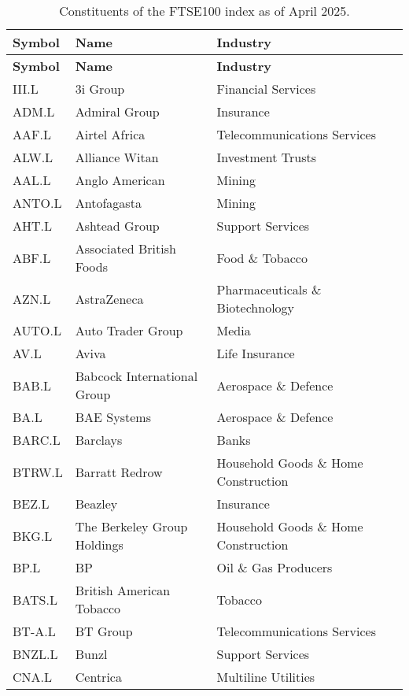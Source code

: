 \begin{longtable}{|p{2cm}|p{4cm}|p{6cm}|}
\caption{Constituents of the FTSE100 index as of April 2025. \cite{WikipediaFtse100}}
\label{tab:ftse100constituents}
\\ 
\hline
\textbf{Symbol} & \textbf{Name} & \textbf{Industry} \\ \midrule
\endfirsthead

\hline
\textbf{Symbol} & \textbf{Name} & \textbf{Industry} \\ \midrule
\endhead

\endfoot

\hline
III.L & 3i Group & Financial Services \\ \hline
ADM.L & Admiral Group & Insurance \\ \hline
AAF.L & Airtel Africa & Telecommunications Services \\ \hline
ALW.L & Alliance Witan & Investment Trusts \\ \hline
AAL.L & Anglo American & Mining \\ \hline
ANTO.L & Antofagasta & Mining \\ \hline
AHT.L & Ashtead Group & Support Services \\ \hline
ABF.L & Associated British Foods & Food \& Tobacco \\ \hline
AZN.L & AstraZeneca & Pharmaceuticals \& Biotechnology \\ \hline
AUTO.L & Auto Trader Group & Media \\ \hline
AV.L & Aviva & Life Insurance \\ \hline
BAB.L & Babcock International Group & Aerospace \& Defence \\ \hline
BA.L & BAE Systems & Aerospace \& Defence \\ \hline
BARC.L & Barclays & Banks \\ \hline
BTRW.L & Barratt Redrow & Household Goods \& Home Construction \\ \hline
BEZ.L & Beazley & Insurance \\ \hline
BKG.L & The Berkeley Group Holdings & Household Goods \& Home Construction \\ \hline
BP.L & BP & Oil \& Gas Producers \\ \hline
BATS.L & British American Tobacco & Tobacco \\ \hline
BT-A.L & BT Group & Telecommunications Services \\ \hline
BNZL.L & Bunzl & Support Services \\ \hline
CNA.L & Centrica & Multiline Utilities \\ \hline

\end{longtable}

